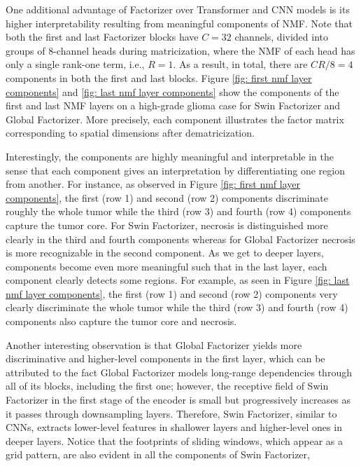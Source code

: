 \documentclass[a4,12pt]{article}
\begin{document}
	One additional advantage of Factorizer over Transformer and CNN models is its higher interpretability resulting from meaningful components of NMF. Note that both the first and last Factorizer blocks have $ C = 32 $ channels, divided into groups of 8-channel heads during matricization, where the NMF of each head has only a single rank-one term, i.e., $ R = 1 $. As a result, in total, there are $ CR/8 = 4 $ components in both the first and last blocks. Figure \ref{fig: first nmf layer components} and \ref{fig: last nmf layer components} show the components of the first and last NMF layers on a high-grade glioma case for Swin Factorizer and Global Factorizer. More precisely, each component illustrates the factor matrix corresponding to spatial dimensions after dematricization.
	
	Interestingly, the components are highly meaningful and interpretable in the sense that each component gives an interpretation by differentiating one region from another. For instance, as observed in Figure \ref{fig: first nmf layer components}, the first (row 1) and second (row 2) components discriminate roughly the whole tumor while the third (row 3) and fourth (row 4) components capture the tumor core. For Swin Factorizer, necrosis is distinguished more clearly in the third and fourth components whereas for Global Factorizer necrosis is more recognizable in the second component. As we get to deeper layers, components become even more meaningful such that in the last layer, each component clearly detects some regions. For example, as seen in Figure \ref{fig: last nmf layer components}, the first (row 1) and second (row 2) components very clearly discriminate the whole tumor while the third (row 3) and fourth (row 4) components also capture the tumor core and necrosis. 
	
	Another interesting observation is that Global Factorizer yields more discriminative and higher-level components in the first layer, which can be attributed to the fact Global Factorizer models long-range dependencies through all of its blocks, including the first one; however, the receptive field of Swin Factorizer in the first stage of the encoder is small but progressively increases as it passes through downsampling layers. Therefore, Swin Factorizer, similar to CNNs, extracts lower-level features in shallower layers and higher-level ones in deeper layers. Notice that the footprints of sliding windows, which appear as a grid pattern, are also evident in all the components of Swin Factorizer, 
	
\end{document}
